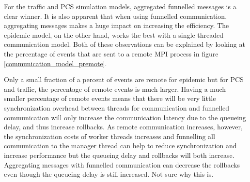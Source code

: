 \documentclass[11pt]{book}
\begin{document}
For the traffic and PCS simulation models, aggregated funnelled messages is a clear winner. It
is also apparent that when using funnelled communication, aggregating messages makes a huge
impact on increasing the efficiency. The epidemic model, on the other hand, works the best with
a single threaded communication model. Both of these observations can be explained by looking
at the percentage of events that are sent to a remote MPI process in figure \ref{communication_model_premote}.

Only a small fraction of a percent of events are remote for epidemic but for PCS and traffic,
the percentage of remote events is much larger. Having a much smaller percentage of remote
events means that there will be very little synchronization overhead between threads for communication
and funnelled communication will only increase the communication latency due to the queueing delay,
and thus increase rollbacks. As remote communication increases, however, the synchronization costs
of worker threads increases and funnelling all communication to the manager thread can help to
reduce synchronization and increase performance but the queueing delay and rollbacks will both
increase. Aggregating messages with funnelled communication can decrease the rollbacks even
though the queueing delay is still increased. Not sure why this is.
\end{document}
